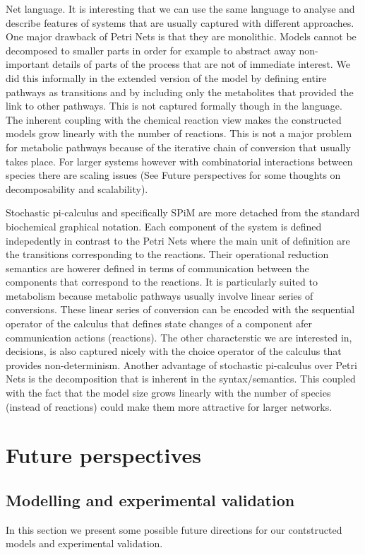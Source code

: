 Net language. It is interesting that we can use the same language to
analyse and describe features of systems that are usually captured
with different approaches. One major drawback of Petri Nets is that they
are monolithic. Models cannot be decomposed to smaller parts in order
for example to abstract away non-important details of parts of the
process that are not of immediate interest. We did this informally in
the extended version of the model by defining entire pathways as
transitions and by including only the metabolites that provided the link
to other pathways. This is not captured formally though in the
language. The inherent coupling with the chemical reaction view makes
the constructed models grow linearly with the number of
reactions. This is not a major problem for metabolic pathways because of
the iterative chain of conversion that usually takes place. For
larger systems however with combinatorial interactions between species
there are scaling issues (See Future perspectives for some thoughts on
decomposability and scalability).

Stochastic pi-calculus and specifically SPiM are more detached from
the standard biochemical graphical notation. Each component of the
system is defined indepedently in contrast to the Petri Nets where the
main unit of definition are the transitions corresponding to the
reactions. Their operational reduction semantics are howerer defined in terms
of communication between the components that correspond to the
reactions. It is particularly suited to metabolism because metabolic
pathways usually involve linear series of conversions. These linear
series of conversion can be encoded with the sequential operator of
the calculus that defines state changes of a component afer
communication actions (reactions). The other characterstic we are
interested in, decisions, is also captured nicely with the choice
operator of the calculus that provides non-determinism. Another
advantage of stochastic pi-calculus over Petri Nets is the
decomposition that is inherent in the syntax/semantics. This coupled
with the fact that the model size grows linearly with the number of
species (instead of reactions) could make them more attractive for
larger networks.



\section{Future perspectives}

\subsection{Modelling and experimental validation}
In this section we present some possible future directions for our
contstructed models and experimental validation.

